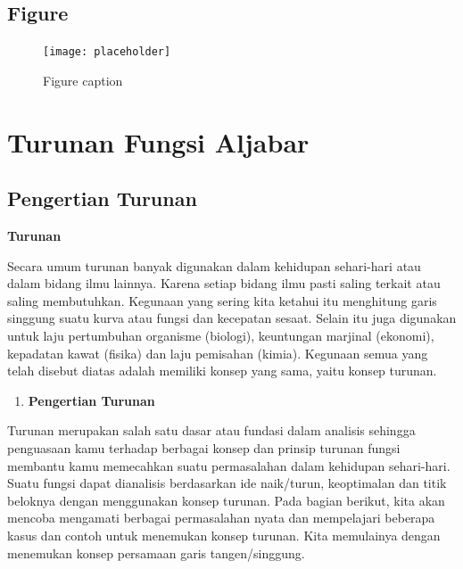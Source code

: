 \documentclass[11pt,fleqn]{book} %
\begin{document}

\section{Figure}

\begin{figure}[h]
\centering\texttt{[image: placeholder]}
\caption{Figure caption}
\end{figure}



\chapter{Turunan Fungsi Aljabar}

\section{Pengertian Turunan}
\begin{center}
\LARGE \textbf{Turunan}
\end{center}

\noindent
Secara umum turunan banyak digunakan dalam kehidupan sehari-hari atau dalam bidang ilmu lainnya. Karena setiap bidang ilmu pasti saling terkait atau saling membutuhkan. Kegunaan yang sering kita ketahui itu menghitung garis singgung suatu kurva atau fungsi dan kecepatan sesaat. Selain itu juga digunakan untuk laju pertumbuhan organisme (biologi), keuntungan marjinal (ekonomi), kepadatan kawat (fisika) dan laju pemisahan (kimia). Kegunaan semua yang telah disebut diatas adalah memiliki konsep yang sama, yaitu konsep turunan.

\noindent
\begin{enumerate}
\item \textbf{Pengertian Turunan }
\end{enumerate}

\noindent 
Turunan merupakan salah satu dasar atau fundasi dalam analisis sehingga penguasaan kamu terhadap berbagai konsep dan prinsip turunan fungsi membantu kamu memecahkan suatu permasalahan dalam kehidupan sehari-hari. Suatu fungsi dapat dianalisis berdasarkan ide naik/turun, keoptimalan dan titik beloknya dengan menggunakan konsep turunan. Pada bagian berikut, kita akan mencoba mengamati berbagai permasalahan nyata dan mempelajari beberapa kasus dan contoh untuk menemukan konsep turunan. Kita memulainya dengan menemukan konsep persamaan garis tangen/singgung.
\end{document}

